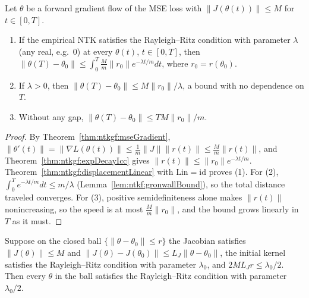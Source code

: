 \begin{theorem}\label{thm:ntkgf:displacementBound}
  \leanok
Let $\theta$ be a forward gradient flow of the MSE loss with $\|J(\theta(t))\|\le M$ for $t\in[0,T]$.
\begin{enumerate}
  \item If the empirical NTK satisfies the Rayleigh--Ritz condition with parameter $\lambda$ (any real, e.g.\ $0$) at every $\theta(t)$, $t\in[0,T]$, then
        $\|\theta(T)-\theta_0\|\le\int_0^T\frac Mm\|r_0\|e^{-\lambda t/m}dt$, where $r_0=r(\theta_0)$.
  \item If $\lambda>0$, then $\|\theta(T)-\theta_0\|\le M\|r_0\|/\lambda$, a bound with no dependence on $T$.
  \item Without any gap, $\|\theta(T)-\theta_0\|\le TM\|r_0\|/m$.
\end{enumerate}
\end{theorem}

\begin{proof}
  \leanok
By Theorem~\ref{thm:ntkgf:mseGradient}, $\|\theta'(t)\|=\|\nabla L(\theta(t))\|\le\frac1m\|J\|\|r(t)\|\le\frac Mm\|r(t)\|$, and Theorem~\ref{thm:ntkgf:expDecayIcc} gives $\|r(t)\|\le\|r_0\|e^{-\lambda t/m}$.
Theorem~\ref{thm:ntkgf:displacementLinear} with $\mathrm{Lin}=\mathrm{id}$ proves (1). For (2), $\int_0^Te^{-\lambda t/m}dt\le m/\lambda$ (Lemma~\ref{lem:ntkf:gronwallBound}), so the total distance traveled converges.
For (3), positive semidefiniteness alone makes $\|r(t)\|$ nonincreasing, so the speed is at most $\frac Mm\|r_0\|$, and the bound grows linearly in $T$ as it must.
\end{proof}

\begin{theorem}\label{thm:ntkgf:rayleighBall}
  \leanok
Suppose on the closed ball $\{\|\theta-\theta_0\|\le r\}$ the Jacobian satisfies $\|J(\theta)\|\le M$ and $\|J(\theta)-J(\theta_0)\|\le L_J\|\theta-\theta_0\|$, the initial kernel satisfies
the Rayleigh--Ritz condition with parameter $\lambda_0$, and $2ML_Jr\le\lambda_0/2$. Then every $\theta$ in the ball satisfies the Rayleigh--Ritz condition with parameter $\lambda_0/2$.
\end{theorem}

